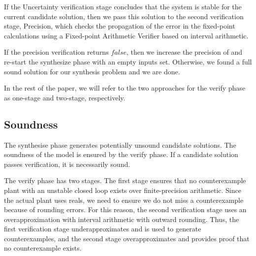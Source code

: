 \documentclass[final]{sig-alternate-05-2015}
\begin{document}
If the {\sc Uncertainty} verification stage concludes that the system is
stable for the current candidate solution, then we pass this solution to the
second verification stage, {\sc Precision}, which checks the propagation of
the error in the fixed-point calculations using a Fixed-point Arithmetic
Verifier based on interval arithmetic.
%
%

If the {\sc precision} verification returns $\mathit{false}$, then we
increase the precision of  and re-start the {\sc
  synthesize} phase with an empty {\sc inputs} set.  Otherwise, we
found a full sound solution for our synthesis problem and we are done.

In the rest of the paper, we will refer to the two approaches 
for the {\sc verify} phase as one-stage and two-stage, respectively.

\subsection{Soundness}

The {\sc synthesise} phase generates potentially unsound candidate
solutions.  The soundness of the model is ensured by the {\sc verify} phase. 
If a candidate solution passes verification, it is necessarily sound.

The {\sc verify} phase has two stages.  The first stage ensures that no
counterexample plant with an unstable closed loop exists over
finite-precision arithmetic.  Since the actual plant uses reals, we need to
ensure we do not miss a counterexample because of rounding errors.  For this
reason, the second verification stage uses an overapproximation with
interval arithmetic with outward rounding.  Thus, the first verification
stage underapproximates and is used to generate counterexamples, and the
second stage overapproximates and provides proof that no counterexample
exists.
\end{document}
